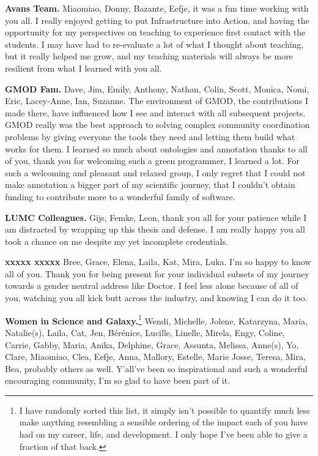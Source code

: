 \textbf{Avans Team.} Miaomiao, Donny, Bazante, Eefje, it was a fun time working with you all. I really enjoyed getting to put Infrastructure into Action, and having the opportunity for my perspectives on teaching to experience first contact with the  students. I may have had to re-evaluate a lot of what I thought about teaching, but it really helped me grow, and my teaching materials will always be more resilient from what I learned with you all.

\textbf{GMOD Fam.} Dave, Jim, Emily, Anthony, Nathan, Colin, Scott, Monica, Nomi, Eric, Lacey-Anne, Ian, Suzanne. The environment of GMOD, the contributions I made there, have influenced how I see and interact with all subsequent projects. GMOD really was the best approach to solving complex community coordination problems by giving everyone the tools they need and letting them build what works for them. I learned so much about ontologies and annotation thanks to all of you, thank you for welcoming such a green programmer, I learned a lot. For such a welcoming and pleasant and relaxed group, I only regret that I could not make annotation a bigger part of my scientific journey, that I couldn't obtain funding to contribute more to a wonderful family of software.

\textbf{LUMC Colleagues.} Gijs, Femke, Leon, thank you all for your patience while I am distracted by wrapping up this thesis and defense. I am really happy you all took a chance on me despite my yet incomplete credentials.

\textbf{{\fontRedacted xxxxx} {\fontRedacted xxxxx}} Bree, Grace, Elena, Laila, Kat, Mira, Luka. I'm so happy to know all of you. Thank you for being present for your individual subsets of my journey towards a gender neutral address like Doctor. I feel less alone because of all of you, watching you all kick butt across the industry, and knowing I can do it too.

\textbf{Women in Science and Galaxy.}\footnote{I have randomly sorted this list, it simply isn't possible to quantify much less make anything resembling a sensible ordering of the impact each of you have had on my career, life, and development. I only hope I've been able to give a fraction of that back.} Wendi, Michelle, Jolene, Katarzyna, Maria, Natalie(s), Laila, Cat, Jen, Bérénice, Lucille, Linelle, Mirela, Engy, Coline, Carrie, Gabby, Maria, Anika, Delphine, Grace, Assunta, Melissa, Anne(s), Yo, Clare, Miaomiao, Clea, Eefje, Anna, Mallory, Estelle, Marie Josse, Teresa, Mira, Bea, probably others as well. Y'all've been so inspirational and such a wonderful encouraging community, I'm so glad to have been part of it.

